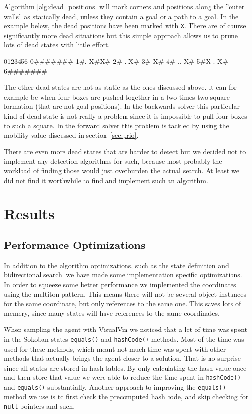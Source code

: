 \documentclass[a4paper,11pt]{article}
\begin{document}
Algorithm \ref{alg:dead_positions} will mark corners and positions along the
''outer walls'' as statically dead, unless they contain a goal or a path to a goal.
In the example below, the dead positions have been marked with \verb!X!.
There are of course significantly more dead situations but this simple approach 
allows us to prune lots of dead states with little effort.

\begin{verbatimtab}
 0123456
0#######
1#. X#X#
2# .  X#
3#    X#
4# .. X#
5#X . X#
6#######

\end{verbatimtab}

The other dead states are not as static as the ones discussed above. 
It can for example be when four boxes are pushed together in a two times two square formation
(that are not goal positions).
In the backwards solver this particular kind of dead state is not really a problem since it is
impossible to pull four boxes to such a square.
In the forward solver this problem is tackled by using the mobility value discussed in section~\ref{sec:prio}.

There are even more dead states that are harder to detect but we decided not
to implement any detection algorithms for such, because most probably the
workload of finding those would just overburden the actual search.
At least we did not find it worthwhile to find and implement such an algorithm.

\section{Results}


\subsection{Performance Optimizations}
\label{sec:opt}
In addition to the algorithm optimizations, such as the state definition and bidirectional search,
we have made some implementation specific optimizations.
In order to squeeze some better performance we implemented
the coordinates using the multiton pattern.
This means there will not be several object instances for the same coordinate,
but only references to the same one.
This saves lots of memory, since many states will have references to the same coordinates.

When sampling the agent with VisualVm we noticed that a lot of time was spent in the Sokoban states \verb!equals()! and \verb!hashCode()! methods. 
Most of the time was used for these methods, which meant not much time was spent with
other methods that actually brings the agent closer to a solution.
That is no surprise since all states are stored in hash tables. By only calculating the hash value once and then store that value
we were able to reduce the time spent in \verb!hashCode()! and \verb!equals()! substantially.
Another approach to improving the \verb!equals()! method we use
is to first check the precomputed hash code,
and skip checking for \verb!null! pointers and such.
\end{document}
